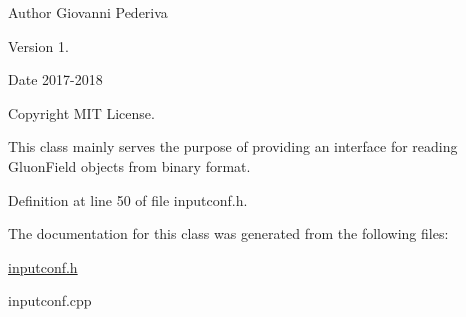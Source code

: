 \begin{DoxyAuthor}{Author}
Giovanni Pederiva 
\end{DoxyAuthor}
\begin{DoxyVersion}{Version}
1. 
\end{DoxyVersion}
\begin{DoxyDate}{Date}
2017-\/2018 
\end{DoxyDate}
\begin{DoxyCopyright}{Copyright}
M\+IT License.
\end{DoxyCopyright}
This class mainly serves the purpose of providing an interface for reading Gluon\+Field objects from binary format. 

Definition at line 50 of file inputconf.\+h.



The documentation for this class was generated from the following files\+:\begin{DoxyCompactItemize}
\item 
\hyperlink{inputconf_8h}{inputconf.\+h}\item 
inputconf.\+cpp\end{DoxyCompactItemize}
